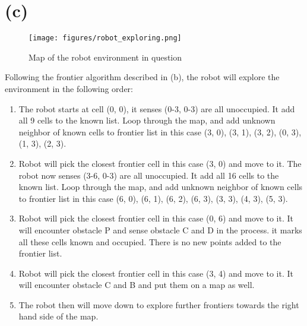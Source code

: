 \documentclass{report}
\begin{document}
\section{(c)}

\begin{figure}[H]
    \centering
    \texttt{[image: figures/robot\_exploring.png]}
    \caption{Map of the robot environment in question}
    \label{robot_exploring:map}
\end{figure}

Following the frontier algorithm described in (b), the robot will explore the environment in the following order:

\begin{enumerate}
    \item The robot starts at cell (0, 0), it senses (0-3, 0-3) are all unoccupied. It add all 9 cells to the known list. Loop through the map, and add unknown neighbor of known cells to frontier list in this case (3, 0), (3, 1), (3, 2), (0, 3), (1, 3), (2, 3).
    \item Robot will pick the closest frontier cell in this case (3, 0) and move to it. The robot now senses (3-6, 0-3) are all unoccupied. It add all 16 cells to the known list. Loop through the map, and add unknown neighbor of known cells to frontier list in this case (6, 0), (6, 1), (6, 2), (6, 3), (3, 3), (4, 3), (5, 3).
    \item Robot will pick the closest frontier cell in this case (0, 6) and move to it. It will encounter obstacle P and sense obstacle C and D in the process. it marks all these cells known and occupied. There is no new points added to the frontier list.
    \item Robot will pick the closest frontier cell in this case (3, 4) and move to it. It will encounter obstacle C and B and put them on a map as well.
    \item The robot then will move down to explore further frontiers towards the right hand side of the map.
\end{enumerate}

\printbibliography
\end{document}
